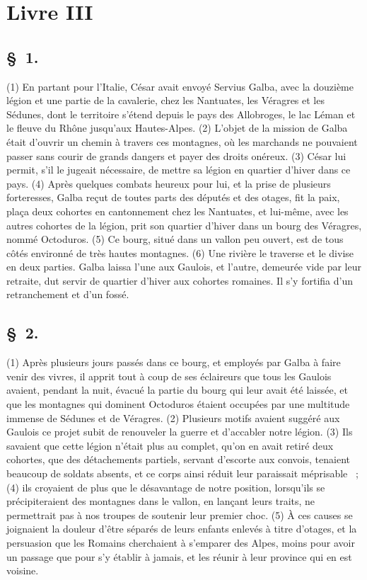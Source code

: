 \documentclass[french,twoside]{book} %
\begin{document}
\section[{Livre III}]{Livre III}\renewcommand{\leftmark}{Livre III}

\subsection[{§ 1.}]{ \textsc{§ 1.} }
\noindent (1) En partant pour l’Italie, César avait envoyé Servius Galba, avec la douzième légion et une partie de la cavalerie, chez les Nantuates, les Véragres et les Sédunes, dont le territoire s’étend depuis le pays des Allobroges, le lac Léman et le fleuve du Rhône jusqu’aux Hautes-Alpes. (2) L'objet de la mission de Galba était d’ouvrir un chemin à travers ces montagnes, où les marchands ne pouvaient passer sans courir de grands dangers et payer des droits onéreux. (3) César lui permit, s’il le jugeait nécessaire, de mettre sa légion en quartier d’hiver dans ce pays. (4) Après quelques combats heureux pour lui, et la prise de plusieurs forteresses, Galba reçut de toutes parts des députés et des otages, fit la paix, plaça deux cohortes en cantonnement chez les Nantuates, et lui-même, avec les autres cohortes de la légion, prit son quartier d’hiver dans un bourg des Véragres, nommé Octoduros. (5) Ce bourg, situé dans un vallon peu ouvert, est de tous côtés environné de très hautes montagnes. (6) Une rivière le traverse et le divise en deux parties. Galba laissa l’une aux Gaulois, et l’autre, demeurée vide par leur retraite, dut servir de quartier d’hiver aux cohortes romaines. Il s’y fortifia d’un retranchement et d’un fossé.
\subsection[{§ 2.}]{ \textsc{§ 2.} }
\noindent (1) Après plusieurs jours passés dans ce bourg, et employés par Galba à faire venir des vivres, il apprit tout à coup de ses éclaireurs que tous les Gaulois avaient, pendant la nuit, évacué la partie du bourg qui leur avait été laissée, et que les montagnes qui dominent Octoduros étaient occupées par une multitude immense de Sédunes et de Véragres. (2) Plusieurs motifs avaient suggéré aux Gaulois ce projet subit de renouveler la guerre et d’accabler notre légion. (3) Ils savaient que cette légion n’était plus au complet, qu’on en avait retiré deux cohortes, que des détachements partiels, servant d’escorte aux convois, tenaient beaucoup de soldats absents, et ce corps ainsi réduit leur paraissait méprisable  ; (4) ils croyaient de plus que le désavantage de notre position, lorsqu’ils se précipiteraient des montagnes dans le vallon, en lançant leurs traits, ne permettrait pas à nos troupes de soutenir leur premier choc. (5) À ces causes se joignaient la douleur d’être séparés de leurs enfants enlevés à titre d’otages, et la persuasion que les Romains cherchaient à s’emparer des Alpes, moins pour avoir un passage que pour s’y établir à jamais, et les réunir à leur province qui en est voisine.
\end{document}
